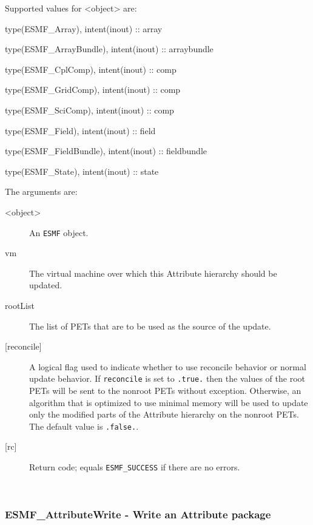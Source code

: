    Supported values for <object> are:
   \begin{description}
   \item type(ESMF\_Array), intent(inout) :: array
   \item type(ESMF\_ArrayBundle), intent(inout) :: arraybundle
   \item type(ESMF\_CplComp), intent(inout) :: comp
   \item type(ESMF\_GridComp), intent(inout) :: comp
   \item type(ESMF\_SciComp), intent(inout) :: comp
   \item type(ESMF\_Field), intent(inout) :: field
   \item type(ESMF\_FieldBundle), intent(inout) :: fieldbundle
   \item type(ESMF\_State), intent(inout) :: state
   \end{description}
  
   The arguments are:
   \begin{description}
   \item [<object>]
   An {\tt ESMF} object.
   \item [vm]
   The virtual machine over which this Attribute hierarchy
   should be updated.
   \item [rootList]
   The list of PETs that are to be used as the source of the update.
   \item [{[reconcile]}] 
   A logical flag used to indicate whether to use reconcile behavior 
   or normal update behavior. If {\tt reconcile} is set to 
   {\tt .true.} then the values of the root PETs will be sent to 
   the nonroot PETs without exception. Otherwise, an algorithm that 
   is optimized to use minimal memory will be used to update only 
   the modified parts of the Attribute hierarchy on the nonroot 
   PETs. The default value is {\tt .false.}. 
   \item [{[rc]}]
   Return code; equals {\tt ESMF\_SUCCESS} if there are no errors.
   \end{description}
  
   
 
\mbox{}\hrulefill\ 
 
\subsubsection [ESMF\_AttributeWrite] {ESMF\_AttributeWrite - Write an Attribute package}


   \label{api:AttributeWrite}
  
